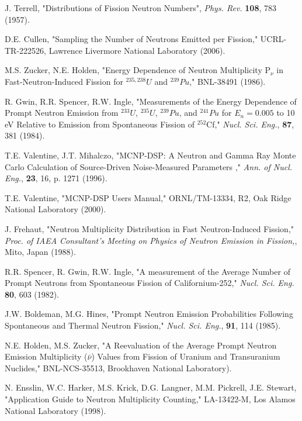 \documentclass[11pt]{article}
\begin{document}
\clearpage
\begin{thebibliography}{99}

 J. Terrell, "Distributions of Fission Neutron
Numbers", \textit{Phys. Rev.} \textbf{108}, 783 (1957).

 D.E. Cullen, "Sampling the Number of Neutrons
Emitted per Fission," UCRL-TR-222526, Lawrence Livermore National
Laboratory (2006).  

 M.S. Zucker, N.E. Holden, "Energy
Dependence of Neutron Multiplicity P$_{\nu}$ in Fast-Neutron-Induced
Fission for $^{235,238}U$ and $^{239}Pu$," BNL-38491 (1986).

 R. Gwin, R.R. Spencer,
R.W. Ingle, "Measurements of the Energy Dependence of Prompt Neutron
Emission from $^{233}U$, $^{235}U$, $^{239}Pu$, and $^{241}Pu$ for
$E_n=0.005$ to 10 eV Relative to Emission from Spontaneous Fission of
$^{252}$Cf," \textit{Nucl. Sci. Eng.}, \textbf{87}, 381 (1984).

 T.E. Valentine, J.T. Mihalczo, "MCNP-DSP: A
Neutron and Gamma Ray Monte Carlo Calculation of Source-Driven
Noise-Measured Parameters ," \textit{Ann. of Nucl. Eng.}, \textbf{23},
16, p. 1271 (1996).

 T.E. Valentine, "MCNP-DSP Users Manual,"
ORNL/TM-13334, R2, Oak Ridge National Laboratory (2000).

 J. Frehaut, "Neutron Multiplicity Distribution
in Fast Neutron-Induced Fission," \textit{Proc. of IAEA Consultant's
Meeting on Physics of Neutron Emission in Fission,}, Mito, Japan
(1988).  


 R.R. Spencer, R. Gwin, R.W. Ingle, "A
measurement of the Average Number of Prompt Neutrons from Spontaneous
Fission of Californium-252," \textit{Nucl. Sci. Eng.} \textbf{80}, 603
(1982).  

 J.W. Boldeman, M.G. Hines, "Prompt
Neutron Emission Probabilities Following Spontaneous and Thermal
Neutron Fission," \textit{Nucl. Sci. Eng.}, \textbf{91}, 114 (1985).

 N.E. Holden,
M.S. Zucker, "A Reevaluation of the Average Prompt Neutron Emission
Multiplicity ($\bar{\nu}$) Values from Fission of Uranium and
Transuranium Nuclides," BNL-NCS-35513, Brookhaven National
Laboratory).  

 N. Ensslin, W.C. Harker, M.S. Krick,
D.G. Langner, M.M. Pickrell, J.E. Stewart, "Application Guide to
Neutron Multiplicity Counting," LA-13422-M, Los Alamos National
Laboratory (1998).  


\end{thebibliography}
\end{document}
